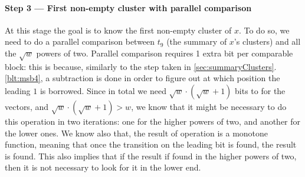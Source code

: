 \paragraph{Step 3 --- First non-empty cluster with parallel comparison} \label{sec:parallel}
At this stage the goal is to know the first non-empty cluster of $x$. To do so, we need to do a parallel comparison between $t_9$ (the summary of $x$'s clusters) and all the $\sqrt{w}$ powers of two. Parallel comparison requires 1 extra bit per comparable block: this is because, similarly to the step taken in \ref{sec:summaryClusters}.\ref{blt:msb4}, a subtraction is done in order to figure out at which position the leading $1$ is borrowed. Since in total we need $\sqrt{w}\cdot(\sqrt{w} + 1)$ bits to for the vectors, and $\sqrt{w}\cdot(\sqrt{w} + 1) > w$, we know that it might be necessary to do this operation in two iterations: one for the higher powers of two, and another for the lower ones. We know also that, the result of operation is a monotone function, meaning that once the transition on the leading bit is found, the result is found. This also implies that if the result if found in the higher powers of two, then it is not necessary to look for it in the lower end.

